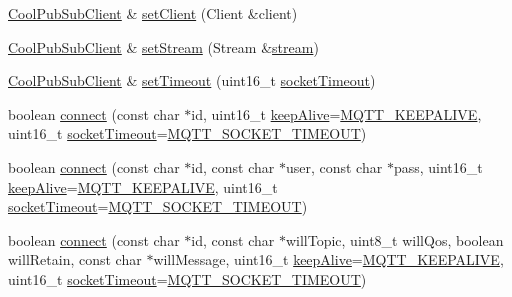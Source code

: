 \begin{DoxyCompactItemize}
\item 
\hyperlink{class_cool_pub_sub_client}{Cool\+Pub\+Sub\+Client} \& \hyperlink{class_cool_pub_sub_client_a7ee119b786010561ab6a9afa0798e91d}{set\+Client} (Client \&client)
\item 
\hyperlink{class_cool_pub_sub_client}{Cool\+Pub\+Sub\+Client} \& \hyperlink{class_cool_pub_sub_client_ae97e40823ea689ff9e36d5bdd71bb933}{set\+Stream} (Stream \&\hyperlink{class_cool_pub_sub_client_a7a92417b317e7bd9502ed37752111705}{stream})
\item 
\hyperlink{class_cool_pub_sub_client}{Cool\+Pub\+Sub\+Client} \& \hyperlink{class_cool_pub_sub_client_a2276c7e52531b597b4342fadf3722f43}{set\+Timeout} (uint16\+\_\+t \hyperlink{class_cool_pub_sub_client_a2d7b7c7dda1313ff1492b158c3712630}{socket\+Timeout})
\item 
boolean \hyperlink{class_cool_pub_sub_client_a2664c2ebc302b2fa49f493a339ecc891}{connect} (const char $\ast$id, uint16\+\_\+t \hyperlink{class_cool_pub_sub_client_a653f086eb3a039c08116bb828e35f7c1}{keep\+Alive}=\hyperlink{_cool_pub_sub_client_8h_afb4dd8c75385ab30e659314df7c2c335}{M\+Q\+T\+T\+\_\+\+K\+E\+E\+P\+A\+L\+I\+VE}, uint16\+\_\+t \hyperlink{class_cool_pub_sub_client_a2d7b7c7dda1313ff1492b158c3712630}{socket\+Timeout}=\hyperlink{_cool_pub_sub_client_8h_a092cc564e4d7f03fdab6137e30a7f05b}{M\+Q\+T\+T\+\_\+\+S\+O\+C\+K\+E\+T\+\_\+\+T\+I\+M\+E\+O\+UT})
\item 
boolean \hyperlink{class_cool_pub_sub_client_a7f30e39bf4ca5ea5fb9747c403639a03}{connect} (const char $\ast$id, const char $\ast$user, const char $\ast$pass, uint16\+\_\+t \hyperlink{class_cool_pub_sub_client_a653f086eb3a039c08116bb828e35f7c1}{keep\+Alive}=\hyperlink{_cool_pub_sub_client_8h_afb4dd8c75385ab30e659314df7c2c335}{M\+Q\+T\+T\+\_\+\+K\+E\+E\+P\+A\+L\+I\+VE}, uint16\+\_\+t \hyperlink{class_cool_pub_sub_client_a2d7b7c7dda1313ff1492b158c3712630}{socket\+Timeout}=\hyperlink{_cool_pub_sub_client_8h_a092cc564e4d7f03fdab6137e30a7f05b}{M\+Q\+T\+T\+\_\+\+S\+O\+C\+K\+E\+T\+\_\+\+T\+I\+M\+E\+O\+UT})
\item 
boolean \hyperlink{class_cool_pub_sub_client_af461a5a08fda1c3237e706965704ddb6}{connect} (const char $\ast$id, const char $\ast$will\+Topic, uint8\+\_\+t will\+Qos, boolean will\+Retain, const char $\ast$will\+Message, uint16\+\_\+t \hyperlink{class_cool_pub_sub_client_a653f086eb3a039c08116bb828e35f7c1}{keep\+Alive}=\hyperlink{_cool_pub_sub_client_8h_afb4dd8c75385ab30e659314df7c2c335}{M\+Q\+T\+T\+\_\+\+K\+E\+E\+P\+A\+L\+I\+VE}, uint16\+\_\+t \hyperlink{class_cool_pub_sub_client_a2d7b7c7dda1313ff1492b158c3712630}{socket\+Timeout}=\hyperlink{_cool_pub_sub_client_8h_a092cc564e4d7f03fdab6137e30a7f05b}{M\+Q\+T\+T\+\_\+\+S\+O\+C\+K\+E\+T\+\_\+\+T\+I\+M\+E\+O\+UT})

\end{DoxyCompactItemize}
